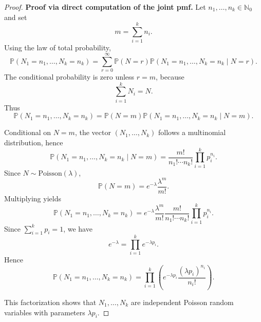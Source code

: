 \documentclass[12pt]{article}
\renewcommand{\(}{\left(}%
\renewcommand{\)}{\right)}%
\renewcommand{\[}{\left[}%
\renewcommand{\]}{\right]}%
\newtheorem{proof}{Proof.}}
\begin{document}
\begin{proof}
\medskip
\noindent
{\bfseries Proof via direct computation of the joint pmf.}
Let $n_1,\dots,n_k\in\mathbb N_0$ and set
\begin{equation*}
m=\sum_{i=1}^k n_i.
\end{equation*}
Using the law of total probability,
\begin{equation*}
\mathbb P(N_1=n_1,\dots,N_k=n_k)
=
\sum_{r=0}^\infty
\mathbb P(N=r)
\mathbb P(N_1=n_1,\dots,N_k=n_k \mid N=r).
\end{equation*}
The conditional probability is zero unless $r=m$, because
\begin{equation*}
\sum_{i=1}^k N_i = N.
\end{equation*}
Thus
\begin{equation*}
\mathbb P(N_1=n_1,\dots,N_k=n_k)
=
\mathbb P(N=m)
\mathbb P(N_1=n_1,\dots,N_k=n_k \mid N=m).
\end{equation*}

Conditional on $N=m$, the vector $(N_1,\dots,N_k)$ follows a
multinomial distribution, hence
\begin{equation*}
\mathbb P(N_1=n_1,\dots,N_k=n_k \mid N=m)
=
\frac{m!}{n_1!\cdots n_k!}
\prod_{i=1}^k p_i^{n_i}.
\end{equation*}
Since $N\sim\mathrm{Poisson}(\lambda)$,
\begin{equation*}
\mathbb P(N=m)
=
e^{-\lambda}\frac{\lambda^m}{m!}.
\end{equation*}
Multiplying yields
\begin{equation*}
\mathbb P(N_1=n_1,\dots,N_k=n_k)
=
e^{-\lambda}
\frac{\lambda^m}{m!}
\frac{m!}{n_1!\cdots n_k!}
\prod_{i=1}^k p_i^{n_i}.
\end{equation*}
Since $\sum_{i=1}^k p_i=1$, we have
\begin{equation*}
e^{-\lambda}
=
\prod_{i=1}^k e^{-\lambda p_i}.
\end{equation*}
Hence
\begin{equation*}
\mathbb P(N_1=n_1,\dots,N_k=n_k)
=
\prod_{i=1}^k
\left(
e^{-\lambda p_i}
\frac{(\lambda p_i)^{n_i}}{n_i!}
\right).
\end{equation*}

This factorization shows that $N_1,\dots,N_k$ are independent
Poisson random variables with parameters $\lambda p_i$.
\end{proof}
\end{document}
